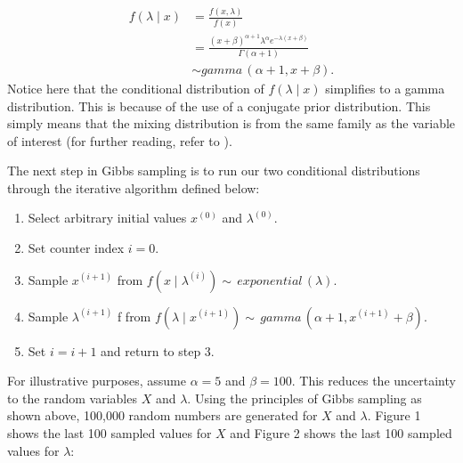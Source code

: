 \documentclass[11pt, oneside]{article}
\begin{document}
\begin{align*}
f(\lambda\mid x) &= \frac{f(x,\lambda)}{f(x)}\\
&= \frac{(x+\beta)^{\alpha+1}\lambda^\alpha e^{-\lambda(x+\beta)}}{\Gamma(\alpha+1)}\\
&\sim gamma\,(\alpha+1,x+\beta).
\end{align*}
Notice here that the conditional distribution of $f(\lambda\mid x)$ simplifies to a gamma distribution. This is because of the use of a conjugate prior distribution. This simply means that the mixing distribution is from the same family as the variable of interest (for further reading, refer to \cite{Casella and Berger}).  

The next step in Gibbs sampling is to run our two conditional distributions through the iterative algorithm defined below:
\begin{enumerate}
\item Select arbitrary initial values $x^{(0)}$ and $\lambda^{(0)}$.
\item Set counter index $i=0$.
\item Sample $x^{(i+1)}$ from $f(x\mid\lambda^{(i)})\sim\,exponential\,(\lambda)$.
\item Sample $\lambda^{(i+1)}$ f from $f(\lambda\mid x^{(i+1)})\sim\,gamma\,(\alpha+1,x^{(i+1)}+\beta)$.
\item Set $i=i+1$ and return to step 3.
\end{enumerate}

For illustrative purposes, assume $\alpha = 5$ and $\beta = 100$. This reduces the uncertainty to the random variables $X$ and $\lambda$. Using the principles of Gibbs sampling as shown above, 100,000 random numbers are generated for $X$ and $\lambda$. Figure 1 shows the last 100 sampled values for $X$ and Figure 2 shows the last 100 sampled values for $\lambda$:
\end{document}
